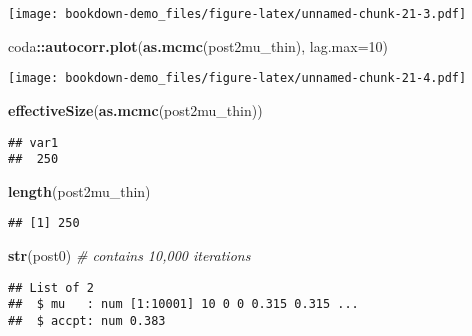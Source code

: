 \documentclass[
]{book}
\newenvironment{Shaded}{\begin{snugshade}}{\end{snugshade}}
\newcommand{\CommentTok}[1]{\textcolor[rgb]{0.56,0.35,0.01}{\textit{#1}}}
\newcommand{\DataTypeTok}[1]{\textcolor[rgb]{0.13,0.29,0.53}{#1}}
\newcommand{\DecValTok}[1]{\textcolor[rgb]{0.00,0.00,0.81}{#1}}
\newcommand{\KeywordTok}[1]{\textcolor[rgb]{0.13,0.29,0.53}{\textbf{#1}}}
\newcommand{\NormalTok}[1]{#1}
\newcommand{\OperatorTok}[1]{\textcolor[rgb]{0.81,0.36,0.00}{\textbf{#1}}}
\begin{document}
\texttt{[image: bookdown-demo\_files/figure-latex/unnamed-chunk-21-3.pdf]}

\begin{Shaded}
\begin{Highlighting}[]
\NormalTok{coda}\OperatorTok{::}\KeywordTok{autocorr.plot}\NormalTok{(}\KeywordTok{as.mcmc}\NormalTok{(post2mu_thin), }\DataTypeTok{lag.max=}\DecValTok{10}\NormalTok{)}
\end{Highlighting}
\end{Shaded}

\texttt{[image: bookdown-demo\_files/figure-latex/unnamed-chunk-21-4.pdf]}

\begin{Shaded}
\begin{Highlighting}[]
\KeywordTok{effectiveSize}\NormalTok{(}\KeywordTok{as.mcmc}\NormalTok{(post2mu_thin))}
\end{Highlighting}
\end{Shaded}

\begin{verbatim}
## var1 
##  250
\end{verbatim}

\begin{Shaded}
\begin{Highlighting}[]
\KeywordTok{length}\NormalTok{(post2mu_thin)}
\end{Highlighting}
\end{Shaded}

\begin{verbatim}
## [1] 250
\end{verbatim}

\begin{Shaded}
\begin{Highlighting}[]
\KeywordTok{str}\NormalTok{(post0) }\CommentTok{# contains 10,000 iterations}
\end{Highlighting}
\end{Shaded}

\begin{verbatim}
## List of 2
##  $ mu   : num [1:10001] 10 0 0 0.315 0.315 ...
##  $ accpt: num 0.383
\end{verbatim}

\begin{Shaded}
\end{Shaded}
\end{document}
